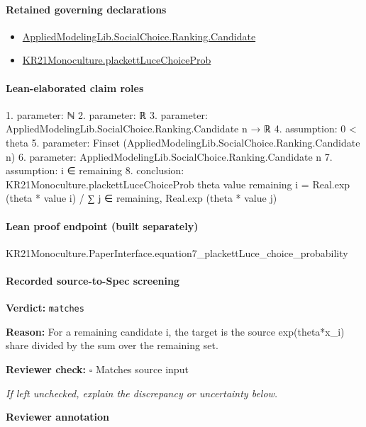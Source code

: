 \documentclass[10pt]{article}
\newcommand{\reviewerbox}{%
  \par\noindent\fbox{\parbox{0.96\linewidth}{\rule{0pt}{0.38in}}}\par
}
\newcommand{\reviewmatch}[1]{%
  \par\noindent\textbf{Reviewer check:} $\square$\; #1\par
  \noindent\emph{If left unchecked, explain the discrepancy or uncertainty below.}\par
}
\begin{document}
\paragraph{Retained governing declarations}
\begin{itemize}\raggedright
\item \hyperlink{library-prerequisite-8c0e6c25845ae78a}{Applied\allowbreak{}Modeling\allowbreak{}Lib.\allowbreak{}Social\allowbreak{}Choice.\allowbreak{}Ranking.\allowbreak{}Candidate}
\item \hyperlink{governing-declaration-da550aa6754694f6}{KR21\allowbreak{}Monoculture.\allowbreak{}plackett\allowbreak{}Luce\allowbreak{}Choice\allowbreak{}Prob}
\end{itemize}
\paragraph{Lean-elaborated claim roles}\begin{ReviewVerbatim}
1. parameter: ℕ
2. parameter: ℝ
3. parameter: AppliedModelingLib.SocialChoice.Ranking.Candidate n → ℝ
4. assumption: 0 < theta
5. parameter: Finset (AppliedModelingLib.SocialChoice.Ranking.Candidate n)
6. parameter: AppliedModelingLib.SocialChoice.Ranking.Candidate n
7. assumption: i ∈ remaining
8. conclusion: KR21Monoculture.plackettLuceChoiceProb theta value remaining i =
  Real.exp (theta * value i) / ∑ j ∈ remaining, Real.exp (theta * value j)
\end{ReviewVerbatim}

\paragraph{Lean proof endpoint (built separately)}\begin{ReviewVerbatim}
KR21Monoculture.PaperInterface.equation7_plackettLuce_choice_probability
\end{ReviewVerbatim}

\paragraph{Recorded source-to-Spec screening}
\textbf{Verdict:} \texttt{matches}
\\
{\raggedright
\textbf{Reason:} For a remaining candidate i, the target is the source exp(theta*x\_\allowbreak{}i) share divided by the sum over the remaining set.\allowbreak{}
\par}
\reviewmatch{Matches source input}
\noindent\textbf{Reviewer annotation}\par
\reviewerbox
\clearpage
\hypertarget{source-claim-0156e1eedd228cc4}{}
\end{document}
